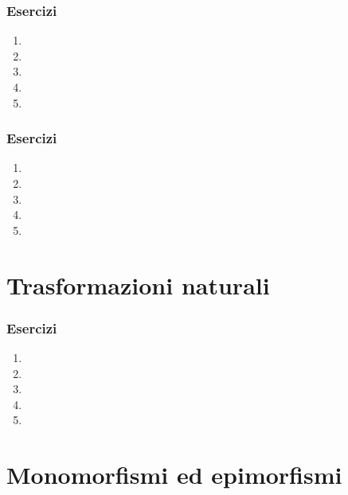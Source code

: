 

\subsubsection*{Esercizi}
\begin{enumerate}
	\item
	\item
	\item
	\item
	\item
\end{enumerate}

\subsubsection*{Esercizi}
\begin{enumerate}
	\item
	\item
	\item
	\item
	\item
\end{enumerate}


\section{Trasformazioni naturali}\label{sec_tnat}

\subsubsection*{Esercizi}
\begin{enumerate}
	\item
	\item
	\item
	\item
	\item
\end{enumerate}

\section{Monomorfismi ed epimorfismi}

